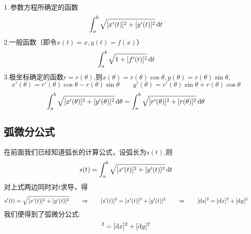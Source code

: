 \\ 1.$\,$参数方程所确定的函数
\begin{equation}
	\int_{a}^{b}\sqrt{[x'(t)]^2+[y'(t)]^2}\,{\rm{d}} t
\end{equation}
2.一般函数（即令$x(t)=x,y(t)=f(x)$）
\begin{equation}
	\int_{a}^{b}\sqrt{1+[f'(t)]^2}\,{\rm{d}} t
\end{equation}
3.极坐标确定的函数$r=r(\theta)$,则$x(\theta)=r(\theta)\cos \theta,y(\theta)=r(\theta)\sin\theta$,
\begin{equation}
	\nonumber
	x'(\theta)=r'(\theta)\cos \theta-r(\theta)\sin \theta \hspace{2em} y'(\theta)=r'(\theta)\sin \theta+r(\theta)\cos \theta
\end{equation}
\begin{equation}
	\int_{a}^{b}\sqrt{[x'(\theta)]^2+[y'(\theta)]^2}\,{\rm{d}} \theta=\int_{a}^{b}\sqrt{[r'(\theta)]^2+[r(\theta)]^2}\,{\rm{d}} \theta
\end{equation}
\subsection{弧微分公式}
在前面我们已经知道弧长的计算公式，设弧长为$s(t)$,则
\begin{equation}
	s(t)=\int_{a}^{b}\sqrt{[x'(t)]^2+[y'(t)]^2}\,{\rm{d}} t
\end{equation}
对上式两边同时对$t$求导，得
\begin{equation}
	s'(t)=\sqrt{[x'(t)]^2+[y'(t)]^2}\hspace*{2em} \Rightarrow \hspace{2em} [s'(t)]^2=[x'(t)]^2+[y'(t)]^2 \hspace*{2em} \Rightarrow  \hspace*{2em} [{\rm{d}} s]^2=[{\rm{d}} x]^2+[{\rm{d}} y]^2
\end{equation}
我们便得到了弧微分公式:
\begin{equation}
	[\d s]^2=[\d x]^2+[\d y]^2
\end{equation}
